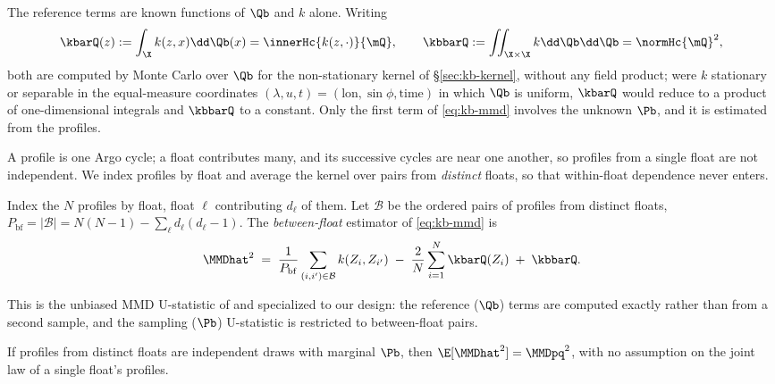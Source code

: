 The reference terms are known functions of $\Qb$ and $k$ alone. Writing
\[
  \kbarQ(z):=\int_\X k(z,x)\dd\Qb(x)=\innerHc{k(z,\cdot)}{\mQ},
  \qquad
  \kbbarQ:=\iint_{\X\times\X} k\dd\Qb\dd\Qb=\normHc{\mQ}^2 ,
\]
both are computed by Monte Carlo over $\Qb$ for the non-stationary kernel of
\S\ref{sec:kb-kernel}, without any field product; were $k$ stationary or separable
in the equal-measure coordinates $(\lambda,u,t)=(\text{lon},\sin\phi,\text{time})$
in which $\Qb$ is uniform, $\kbarQ$ would reduce to a product of one-dimensional
integrals and $\kbbarQ$ to a constant. Only the first term of \eqref{eq:kb-mmd}
involves the unknown $\Pb$, and it is estimated from the profiles.

A profile is one Argo cycle; a float contributes many, and its successive cycles
are near one another, so profiles from a single float are not independent. We index
profiles by float and average the kernel over pairs from \emph{distinct} floats, so
that within-float dependence never enters.

\begin{definition}
\label{def:kb-hat}
Index the $N$ profiles by float, float $\ell$ contributing $d_\ell$ of them. Let
$\mathcal B$ be the ordered pairs of profiles from distinct floats,
$P_{\mathrm{bf}}=|\mathcal B|=N(N-1)-\sum_\ell d_\ell(d_\ell-1)$. The
\emph{between-float} estimator of \eqref{eq:kb-mmd} is
\begin{equation}
  \MMDhat^{2}
  \;=\;\frac{1}{P_{\mathrm{bf}}}\sum_{(i,i')\in\mathcal B}k(Z_i,Z_{i'})
      \;-\;\frac{2}{N}\sum_{i=1}^{N}\kbarQ(Z_i)
      \;+\;\kbbarQ .
  \label{eq:kb-hat}
\end{equation}
\end{definition}

This is the unbiased MMD U-statistic of \citet[eq.~3.32]{muandet2017} and
\citet{gretton2012} specialized to our design: the reference ($\Qb$) terms are
computed exactly rather than from a second sample, and the sampling ($\Pb$)
U-statistic is restricted to between-float pairs.

\begin{lemma}[Unbiasedness]
\label{lem:kb-unbiased}
If profiles from distinct floats are independent draws with marginal $\Pb$, then
$\E[\MMDhat^{2}]=\MMDpq^{2}$, with no assumption on the joint law of a single
float's profiles.
\end{lemma}


